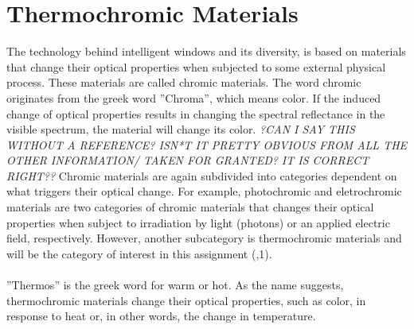 \section{Thermochromic Materials}
%
The technology behind intelligent windows and its diversity, is based on
materials that change their optical properties when subjected to some external physical process.
These materials are called chromic materials. 
The word chromic originates from the greek word ''Chroma'', which means color.
If the induced change of optical properties results in changing the spectral reflectance in
the visible spectrum, the material will change its color. 
\textit{?CAN I SAY THIS WITHOUT A REFERENCE? ISN*T IT PRETTY OBVIOUS FROM ALL THE OTHER INFORMATION/
TAKEN FOR GRANTED? IT IS CORRECT RIGHT??} 
Chromic materials are again subdivided into categories dependent on what triggers their optical change. 
For example, photochromic and eletrochromic materials are two categories of chromic materials 
that changes their optical properties when subject to irradiation by light (photons) or an applied 
electric field, respectively. However, another subcategory is thermochromic materials and will be the
category of interest in this assignment
(\cite{Kiri2010},1).
\\
\\
''Thermos'' is the greek word for warm or hot. 
As the name suggests, thermochromic materials change their optical
properties, such as color, in response to heat or, in other words, the change in temperature.
